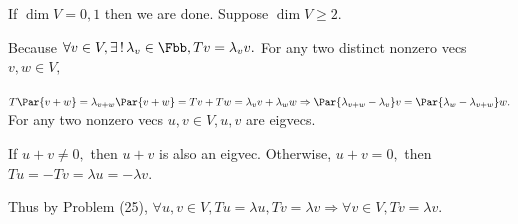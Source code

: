 If $\dim V=0,1$ then we are done. Suppose $\dim V\geqslant 2.$\par\quad
Because $\forall v\in V,\exists\,!\,\lambda_v\in\Fbb,Tv=\lambda_v v.$ For any two distinct nonzero vecs $v,w\in V,$\par\quad
$T\Par{v+w}=\lambda_{v+w}\Par{v+w}=Tv+Tw=\lambda_v v+\lambda_w w\Rightarrow\Par{\lambda_{v+w}-\lambda_v}v=\Par{\lambda_w-\lambda_{v+w}}w.$\PfEnd\vspace{4pt}\quad
\Or For any two nonzero vecs $u,v\in V,u,v$ are eigvecs.\par\quad
If $u+v\neq 0,$ then $u+v$ is also an eigvec. Otherwise, $u+v=0,$ then $Tu=-Tv=\lambda u=-\lambda v.$\par\quad
Thus by Problem (25), $\forall u,v\in V,Tu=\lambda u,Tv=\lambda v\Rightarrow\forall v\in V,Tv=\lambda v.$\PfEnd
\SepLine


